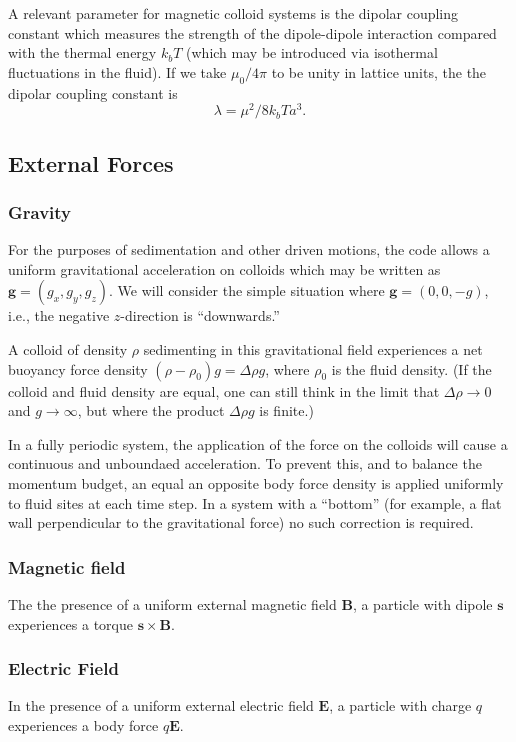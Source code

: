A relevant parameter for magnetic colloid systems is the
dipolar coupling constant which measures the strength of
the dipole-dipole interaction compared with the thermal
energy $k_bT$ (which may be introduced via isothermal
fluctuations in the fluid). If we take $\mu_0 / 4\pi$ to be
unity in lattice units, the the dipolar coupling constant
is
\begin{equation}
\lambda = \mu^2 / 8k_bT a^3.
\end{equation} 
\subsection{External Forces}

\subsubsection{Gravity}

For the purposes of sedimentation and other driven motions, the code
allows a uniform gravitational acceleration on colloids which
may be written as $\mathbf{g} = (g_x, g_y, g_z)$. We will consider the
simple situation where $\mathbf{g} = (0, 0, -g)$, i.e., the
negative $z$-direction is ``downwards.''

A colloid of density $\rho$ sedimenting in this gravitational field
experiences a net buoyancy force density $(\rho-\rho_0)g = \Delta\rho g$,
where $\rho_0$ is the fluid density. (If the colloid and fluid density
are equal, one can still think in the limit that $\Delta\rho \rightarrow 0$
and $g \rightarrow \infty$, but where the product $\Delta\rho g $ is finite.)

In a fully periodic system, the application of the force on the colloids
will cause a continuous and unboundaed acceleration. To prevent this, and
to balance the momentum budget,
an equal an opposite body force density is applied uniformly to fluid
sites at each time step. In a system with a ``bottom'' (for example, a
flat wall perpendicular to the gravitational force) no such correction
is required.


\subsubsection{Magnetic field}

The the presence of a uniform external magnetic field $\mathbf{B}$,
a particle with dipole $\mathbf{s}$ experiences a torque
$\mathbf{s} \times \mathbf{B}$.

\subsubsection{Electric Field}

In the presence of a uniform external electric field $\mathbf{E}$, a
particle with charge $q$ experiences a body force $q\mathbf{E}$.




\vfill
\pagebreak
